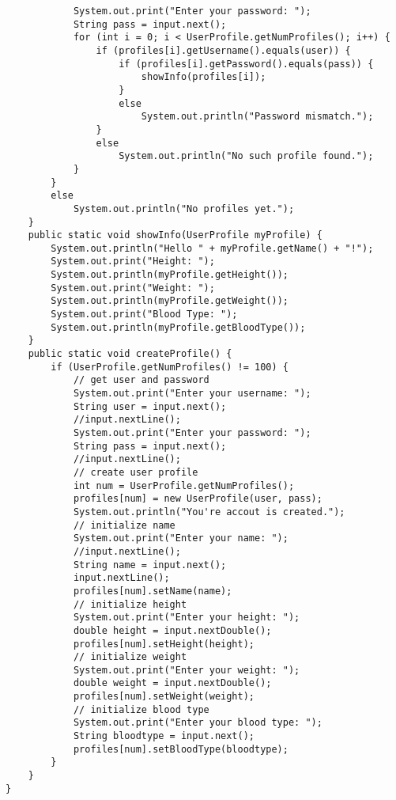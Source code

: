 \begin{enumerate}
\begin{lstlisting}
			System.out.print("Enter your password: ");
			String pass = input.next();
			for (int i = 0; i < UserProfile.getNumProfiles(); i++) {
				if (profiles[i].getUsername().equals(user)) {
					if (profiles[i].getPassword().equals(pass)) {
						showInfo(profiles[i]);
					}
					else
						System.out.println("Password mismatch.");
				}
				else
					System.out.println("No such profile found.");
			}	
		}
		else
			System.out.println("No profiles yet.");
	}
	public static void showInfo(UserProfile myProfile) {
		System.out.println("Hello " + myProfile.getName() + "!");
		System.out.print("Height: ");
		System.out.println(myProfile.getHeight());
		System.out.print("Weight: ");
		System.out.println(myProfile.getWeight());
		System.out.print("Blood Type: ");
		System.out.println(myProfile.getBloodType());
	}
	public static void createProfile() {
		if (UserProfile.getNumProfiles() != 100) {
			// get user and password
			System.out.print("Enter your username: ");
			String user = input.next();
			//input.nextLine();
			System.out.print("Enter your password: ");
			String pass = input.next();
			//input.nextLine();
			// create user profile
			int num = UserProfile.getNumProfiles();
			profiles[num] = new UserProfile(user, pass);
			System.out.println("You're accout is created.");
			// initialize name
			System.out.print("Enter your name: ");
			//input.nextLine();
			String name = input.next();
			input.nextLine();
			profiles[num].setName(name);
			// initialize height
			System.out.print("Enter your height: ");
			double height = input.nextDouble();
			profiles[num].setHeight(height);
			// initialize weight
			System.out.print("Enter your weight: ");
			double weight = input.nextDouble();
			profiles[num].setWeight(weight);
			// initialize blood type
			System.out.print("Enter your blood type: ");
			String bloodtype = input.next();
			profiles[num].setBloodType(bloodtype);
		}
	}
}
\end{lstlisting}
\end{enumerate}